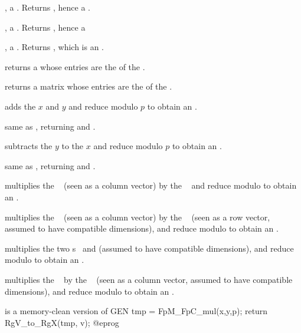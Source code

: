 ,  a . Returns , hence a .

,  a . Returns , hence a 

,  a . Returns , which is an .


 returns a  whose
entries are the  of the .

 returns a matrix whose
entries are the  of the .

 adds the  $x$ and $y$
and reduce modulo $p$ to obtain an .

 same as , returning and
.

 subtracts the  $y$ to
the  $x$ and reduce modulo $p$ to obtain an .

 same as , returning and
.

 multiplies the ~
(seen as a column vector) by the ~ and reduce modulo  to
obtain an .

 multiplies the ~
(seen as a column vector) by the ~ (seen as a row vector,
assumed to have compatible dimensions), and reduce modulo  to obtain
an .

 multiplies the two s~
and  (assumed to have compatible dimensions), and reduce modulo
 to obtain an .

 multiplies the ~
by the ~ (seen as a column vector, assumed to have compatible
dimensions), and reduce modulo  to obtain an .

 is a memory-clean
version of
\bprog
  GEN tmp = FpM_FpC_mul(x,y,p);
  return RgV_to_RgX(tmp, v);
@eprog

